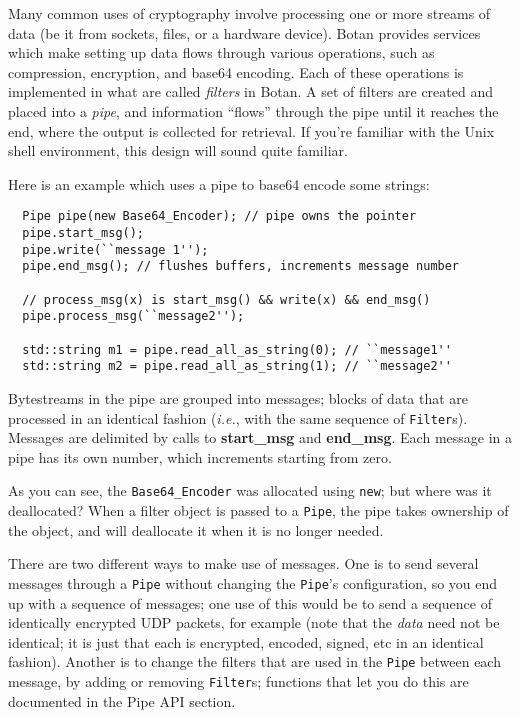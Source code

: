 \documentclass{article}
\newcommand{\function}[1]{\textbf{#1}}
\newcommand{\keyword}[1]{\texttt{#1}}
\newcommand{\type}[1]{\texttt{#1}}
\newcommand{\ie}[0]{\emph{i.e.}}
\begin{document}
Many common uses of cryptography involve processing one or more
streams of data (be it from sockets, files, or a hardware device).
Botan provides services which make setting up data flows through
various operations, such as compression, encryption, and base64
encoding. Each of these operations is implemented in what are called
\emph{filters} in Botan. A set of filters are created and placed into
a \emph{pipe}, and information ``flows'' through the pipe until it
reaches the end, where the output is collected for retrieval. If
you're familiar with the Unix shell environment, this design will
sound quite familiar.

Here is an example which uses a pipe to base64 encode some strings:

\begin{verbatim}
  Pipe pipe(new Base64_Encoder); // pipe owns the pointer
  pipe.start_msg();
  pipe.write(``message 1'');
  pipe.end_msg(); // flushes buffers, increments message number

  // process_msg(x) is start_msg() && write(x) && end_msg()
  pipe.process_msg(``message2'');

  std::string m1 = pipe.read_all_as_string(0); // ``message1''
  std::string m2 = pipe.read_all_as_string(1); // ``message2''
\end{verbatim}

Bytestreams in the pipe are grouped into messages; blocks of data that
are processed in an identical fashion (\ie, with the same sequence of
\type{Filter}s). Messages are delimited by calls to
\function{start\_msg} and \function{end\_msg}. Each message in a pipe
has its own number, which increments starting from zero.

As you can see, the \type{Base64\_Encoder} was allocated using
\keyword{new}; but where was it deallocated? When a filter object is
passed to a \type{Pipe}, the pipe takes ownership of the object, and
will deallocate it when it is no longer needed.

There are two different ways to make use of messages. One is to send
several messages through a \type{Pipe} without changing the \type{Pipe}'s
configuration, so you end up with a sequence of messages; one use of this would
be to send a sequence of identically encrypted UDP packets, for example (note
that the \emph{data} need not be identical; it is just that each is encrypted,
encoded, signed, etc in an identical fashion). Another is to change the filters
that are used in the \type{Pipe} between each message, by adding or removing
\type{Filter}s; functions that let you do this are documented in the Pipe API
section.
\end{document}
